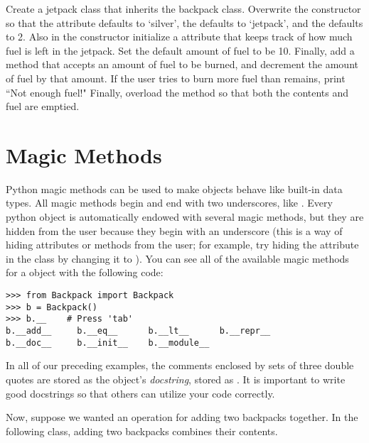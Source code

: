 \begin{problem}

Create a jetpack class that inherits the backpack class.
Overwrite the constructor so that the  attribute defaults to `silver', the  defaults to `jetpack', and the  defaults to 2.
Also in the constructor initialize a  attribute that keeps track of how much fuel is left in the jetpack.
Set the default amount of fuel to be 10.
Finally, add a  method that accepts an amount of fuel to be burned, and decrement the amount of fuel by that amount.
If the user tries to burn more fuel than remains, print ``Not enough fuel!"
Finally, overload the  method so that both the contents and fuel are emptied.
\end{problem}

\section*{Magic Methods}

Python magic methods can be used to make objects behave like built-in data types.
All magic methods begin and end with two underscores, like .
Every python object is automatically endowed with several magic methods, but they are hidden from the user because they begin with an underscore (this is a way of hiding attributes or methods from the user; for example, try hiding the  attribute in the  class by changing it to ).
You can see all of the available magic methods for a  object with the following code:

\begin{lstlisting}
>>> from Backpack import Backpack
>>> b = Backpack()
>>> b.__	# Press 'tab'
b.__add__     b.__eq__      b.__lt__      b.__repr__    
b.__doc__     b.__init__    b.__module__
\end{lstlisting}

In all of our preceding examples, the comments enclosed by sets of three double quotes are stored as the object's \emph{docstring}, stored as .
It is important to write good docstrings so that others can utilize your code correctly.

Now, suppose we wanted an operation for adding two backpacks together.
In the following class, adding two backpacks combines their contents.

